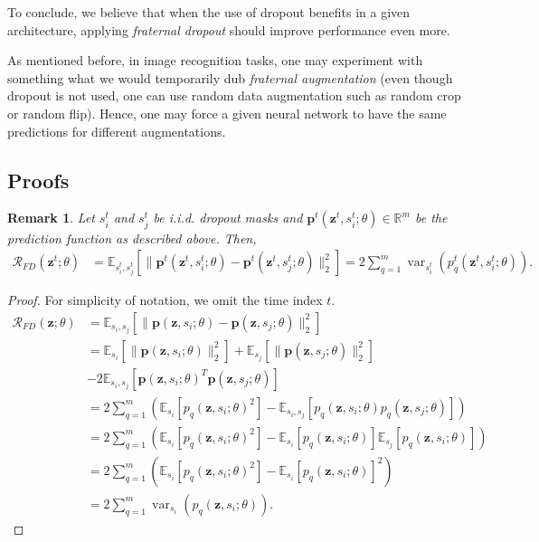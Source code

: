 \documentclass{article} %
\newtheorem{remark}{Remark}
\DeclareMathOperator{\var}{var}
\begin{document}
To conclude, we believe that when the use of dropout benefits in a given architecture, applying \emph{fraternal dropout} should improve performance even more.

As mentioned before, in image recognition tasks, one may experiment with something what we would temporarily dub \emph{fraternal augmentation} (even though dropout is not used, one can use random data augmentation such as random crop or random flip). Hence, one may force a given neural network to have the same predictions for different augmentations.

\newpage
\subsection*{Proofs}
\setcounter{remark}{0}
\setcounter{proposition}{0}

\begin{remark}
Let $s_i^t$ and $s_j^t$ be i.i.d. dropout masks and $\mathbf{p}^t(\mathbf{z}^t, s_i^t; \theta) \in \mathbb{R}^m$ be the prediction function as described above. Then, 
\begin{align}
\mathcal{R}_{FD}(\mathbf{z}^{t}; \theta) &= \mathbb{E}_{s_i^t, s_j^t} \left[ \lVert \mathbf{p}^t(\mathbf{z}^t, s_i^t; \theta) - \mathbf{p}^t(\mathbf{z}^t, s_j^t; \theta) \rVert^2_2 \right] = 2\sum_{q=1}^{m} \var_{s_i^t}( {p}_q^t(\mathbf{z}^t, s_i^t; \theta) ).
\end{align}
\end{remark}
\begin{proof}
For simplicity of notation, we omit the time index $t$.
\begin{align}
\mathcal{R}_{FD}(\mathbf{z}; \theta) &= \mathbb{E}_{s_i, s_j} \left[ \lVert \mathbf{p}(\mathbf{z}, s_i; \theta) - \mathbf{p}(\mathbf{z}, s_j; \theta) \rVert^2_2 \right] \\
&= \mathbb{E}_{s_i}\left[ \lVert \mathbf{p}(\mathbf{z}, s_i; \theta) \rVert^2_2 \right]  + \mathbb{E}_{s_j}\left[ \lVert \mathbf{p}(\mathbf{z}, s_j; \theta) \rVert^2_2 \right] \\ \nonumber
&- 2 \mathbb{E}_{s_i, s_j}\left[  \mathbf{p}(\mathbf{z}, s_i; \theta)^T \mathbf{p}(\mathbf{z}, s_j; \theta)\right] \\
&= 2\sum_{q=1}^{m} \left( \mathbb{E}_{s_i}\left[ {p}_q(\mathbf{z}, s_i; \theta)^2 \right]  - \mathbb{E}_{s_i, s_j}\left[  {p}_{q}(\mathbf{z}, s_i; \theta) {p}_{q}(\mathbf{z}, s_j; \theta)\right] \right) \\
&= 2\sum_{q=1}^{m} \left( \mathbb{E}_{s_i}\left[ {p}_q(\mathbf{z}, s_i; \theta)^2 \right]  - \mathbb{E}_{s_i}\left[ {p}_{q}(\mathbf{z}, s_i; \theta) \right] \mathbb{E}_{s_j}\left[ {p}_{q}(\mathbf{z}, s_i; \theta) \right] \right) \\
&= 2\sum_{q=1}^{m} \left( \mathbb{E}_{s_i}\left[ {p}_q(\mathbf{z}, s_i; \theta)^2 \right]  - \mathbb{E}_{s_i}\left[  {p}_{q}(\mathbf{z}, s_i; \theta) \right]^2 \right) \\
&= 2\sum_{q=1}^{m} \var_{s_i}( {p}_q(\mathbf{z}, s_i; \theta) ).
\end{align}
\end{proof}
\end{document}
